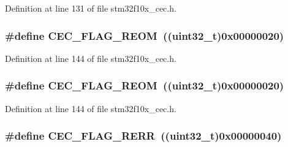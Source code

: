 Definition at line 131 of file stm32f10x\+\_\+cec.\+h.

\subsubsection[{\texorpdfstring{C\+E\+C\+\_\+\+F\+L\+A\+G\+\_\+\+R\+E\+OM}{CEC_FLAG_REOM}}]{\setlength{\rightskip}{0pt plus 5cm}\#define C\+E\+C\+\_\+\+F\+L\+A\+G\+\_\+\+R\+E\+OM~(({\bf uint32\+\_\+t})0x00000020)}\hypertarget{group___c_e_c__flags__definition_gaffeaec4eafbf1efbd88139b9bb0654a7}{}\label{group___c_e_c__flags__definition_gaffeaec4eafbf1efbd88139b9bb0654a7}


Definition at line 144 of file stm32f10x\+\_\+cec.\+h.

\subsubsection[{\texorpdfstring{C\+E\+C\+\_\+\+F\+L\+A\+G\+\_\+\+R\+E\+OM}{CEC_FLAG_REOM}}]{\setlength{\rightskip}{0pt plus 5cm}\#define C\+E\+C\+\_\+\+F\+L\+A\+G\+\_\+\+R\+E\+OM~(({\bf uint32\+\_\+t})0x00000020)}\hypertarget{group___c_e_c__flags__definition_gaffeaec4eafbf1efbd88139b9bb0654a7}{}\label{group___c_e_c__flags__definition_gaffeaec4eafbf1efbd88139b9bb0654a7}


Definition at line 144 of file stm32f10x\+\_\+cec.\+h.

\subsubsection[{\texorpdfstring{C\+E\+C\+\_\+\+F\+L\+A\+G\+\_\+\+R\+E\+RR}{CEC_FLAG_RERR}}]{\setlength{\rightskip}{0pt plus 5cm}\#define C\+E\+C\+\_\+\+F\+L\+A\+G\+\_\+\+R\+E\+RR~(({\bf uint32\+\_\+t})0x00000040)}\hypertarget{group___c_e_c__flags__definition_gac2376c2b958536ab414574f60cb5d75a}{}\label{group___c_e_c__flags__definition_gac2376c2b958536ab414574f60cb5d75a}


